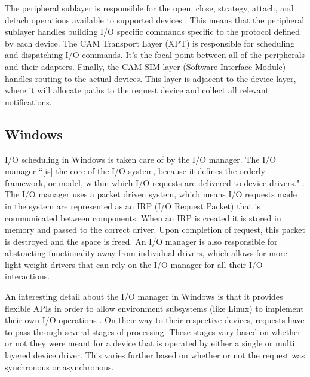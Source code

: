 \documentclass[10pt,draftclsnofoot,onecolumn]{IEEEtran}
\begin{document}
\par The peripheral sublayer is responsible for the open, close, strategy, attach, and detach operations available to supported devices \cite{bsd:1}.
This means that the peripheral sublayer handles building I/O specific commands specific to the protocol defined by each device.
The CAM Transport Layer (XPT) is responsible for scheduling and dispatching I/O commands.
It's the focal point between all of the peripherals and their adapters.
Finally, the CAM SIM layer (Software Interface Module) handles routing to the actual devices.
This layer is adjacent to the device layer, where it will allocate paths to the request device and collect all relevant notifications.

\subsection{Windows}
\label{sub:Scheduling Windows}
\par I/O scheduling in Windows is taken care of by the I/O manager.
The I/O manager ``[is] the core of the I/O system, because it defines the orderly framework, or model, within which I/O requests are delivered to device drivers." \cite{win:2}.
The I/O manager uses a packet driven system, which means I/O requests made in the system are represented as an IRP (I/O Request Packet) that is communicated between components.
When an IRP is created it is stored in memory and passed to the correct driver.
Upon completion of request, this packet is destroyed and the space is freed.
An I/O manager is also responsible for abstracting functionality away from individual drivers, which allows for more light-weight drivers that can rely on the I/O manager for all their I/O interactions.

\par An interesting detail about the I/O manager in Windows is that it provides flexible APIs in order to allow environment subsystems (like Linux) to implement their own I/O operations \cite{win:2}.
On their way to their respective devices, requests have to pass through several stages of processing.
These stages vary based on whether or not they were meant for a device that is operated by either a single or multi layered device driver.
This varies further based on whether or not the request was synchronous or asynchronous.
\end{document}
